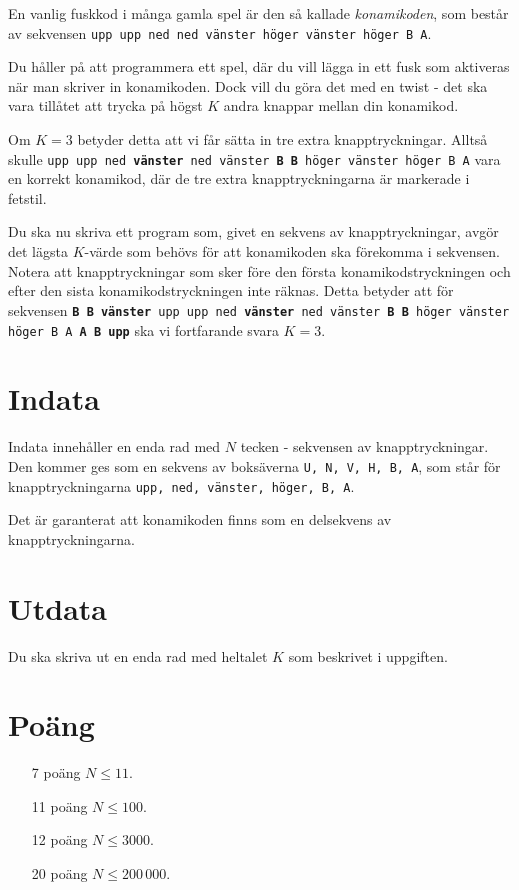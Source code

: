 
En vanlig fuskkod i många gamla spel är den så kallade \emph{konamikoden}, som består av sekvensen \texttt{upp upp ned ned vänster höger vänster höger B A}.

Du håller på att programmera ett spel, där du vill lägga in ett fusk som aktiveras när man skriver in konamikoden. Dock vill du göra det med en twist - det ska vara tillåtet att trycka på högst $K$ andra knappar mellan din konamikod.

Om $K = 3$ betyder detta att vi får sätta in tre extra knapptryckningar. Alltså skulle \texttt{upp upp ned \textbf{vänster} ned vänster \textbf{B B} höger vänster höger B A} vara en korrekt konamikod, där de tre extra knapptryckningarna är markerade i fetstil.

Du ska nu skriva ett program som, givet en sekvens av knapptryckningar, avgör det lägsta $K$-värde som behövs för att konamikoden ska förekomma i sekvensen. Notera att knapptryckningar som sker före den första konamikodstryckningen och efter den sista konamikodstryckningen inte räknas. Detta betyder att för sekvensen \texttt{\textbf{B B vänster} upp upp ned \textbf{vänster} ned vänster \textbf{B B} höger vänster höger B A \textbf{A B upp}} ska vi fortfarande svara $K = 3$.

\section*{Indata}
Indata innehåller en enda rad med $N$ tecken - sekvensen av knapptryckningar. Den kommer ges som en sekvens av boksäverna \texttt{U, N, V, H, B, A}, som står för knapptryckningarna \texttt{upp, ned, vänster, höger, B, A}.

Det är garanterat att konamikoden finns som en delsekvens av knapptryckningarna.

\section*{Utdata}
Du ska skriva ut en enda rad med heltalet $K$ som beskrivet i uppgiften.

\section*{Poäng}

\begin{enumerate}
	\item[7 poäng] $N \le 11$.
	\item[11 poäng] $N \le 100$.
	\item[12 poäng] $N \le 3000$.
	\item[20 poäng] $N \le 200\,000$.
\end{enumerate}
